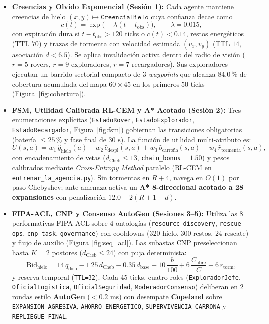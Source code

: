 \documentclass[10pt,a4paper]{article}
\begin{document}
\begin{itemize}
  \item \textbf{Creencias y Olvido Exponencial (Sesión 1):} Cada agente mantiene creencias de hielo $(x,y) \mapsto \texttt{CreenciaHielo}$ cuya confianza decae como
  \begin{equation}
    c(t) = \exp\!\big(-\lambda (t - t_{\text{obs}})\big), \qquad \lambda = 0.015,
  \end{equation}
  con expiración dura si $t - t_{\text{obs}} > 120$ ticks o $c(t) < 0.14$, restos energéticos (TTL $70$) y trazas de tormenta con velocidad estimada $(v_x,v_y)$ (TTL $14$, asociación $d < 6.5$). Se aplica invalidación activa dentro del radio de visión ($r=5$ rovers, $r=9$ exploradores, $r=7$ recargadores). Sus exploradores ejecutan un barrido sectorial compacto de 3 \emph{waypoints} que alcanza $\mathbf{84.0\,\%}$ de cobertura acumulada del mapa $60\times 45$ en los primeros $50$ ticks (Figura~\ref{fig:cobertura}).
  \item \textbf{FSM, Utilidad Calibrada RL-CEM y A* Acotado (Sesión 2):} Tres enumeraciones explícitas (\texttt{EstadoRover}, \texttt{EstadoExplorador}, \texttt{EstadoRecargador}, Figura~\ref{fig:fsm}) gobiernan las transiciones obligatorias (batería $\le 25\,\%$ y fase final de $30\text{ s}$). La función de utilidad multi-atributo es:
  \begin{equation}
    U(s, a) = w_1\,\hat{g}_{\text{hielo}}(a) - w_2\,\hat{c}_{\text{despl}}(s, a) + w_3\,\hat{o}_{\text{carroña}}(s, a) - w_4\,\hat{r}_{\text{tormenta}}(s, a),
  \end{equation}
  con encadenamiento de vetas ($d_{\text{Cheb}} \le 13$, \texttt{chain\_bonus}$=1.50$) y pesos calibrados mediante \emph{Cross-Entropy Method} paralelo (RL-CEM en \texttt{entrenar\_la\_agencia.py}). Sin tormentas en $R+4$, navega en $O(1)$ por paso Chebyshev; ante amenaza activa un \textbf{A* 8-direccional acotado a 28 expansiones} con penalización $12.0 + 2(R+1-d)$.
  \item \textbf{FIPA-ACL, CNP y Consenso AutoGen (Sesiones 3--5):} Utiliza las 8 performativas FIPA-ACL sobre 4 ontologías (\texttt{resource-discovery}, \texttt{rescue-ops}, \texttt{cnp-task}, \texttt{governance}) con cooldowns ($320$ hielo, $300$ restos, $24$ rescate) y flujo de auxilio (Figura~\ref{fig:seq_acl}). Las subastas CNP preseleccionan hasta $K=2$ postores ($d_{\text{Cheb}}\le 24$) con puja determinista:
  \begin{equation}
    \text{Bid}_{\text{hielo}} = 14\,q_{\text{disp}} - 1.25\,d_{\text{Cheb}} - 0.35\,d_{\text{base}} + 10\,\frac{b}{100} + 6\,\frac{C_{\text{libre}}}{C} - 6\,r_{\text{torm}},
  \end{equation}
  y reserva temporal (\texttt{TTL=32}). Cada $45$ ticks, cuatro roles (\texttt{ExploradorJefe}, \texttt{OficialLogistica}, \texttt{OficialSeguridad}, \texttt{ModeradorConsenso}) deliberan en 2 rondas estilo \textbf{AutoGen} ($<0.2\text{ ms}$) con desempate \textbf{Copeland} sobre \texttt{EXPANSION\_AGRESIVA}, \texttt{AHORRO\_ENERGETICO}, \texttt{SUPERVIVENCIA\_CARRONA} y \texttt{REPLIEGUE\_FINAL}.
\end{itemize}
\end{document}
